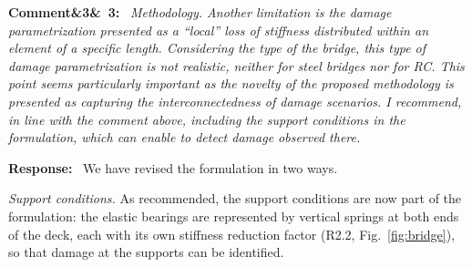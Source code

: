 \documentclass[11pt]{article}
\newenvironment{rcomment}[1]{\par\bigskip\noindent\textbf{Comment\ifx&#1&\else\ #1\fi:}\ \itshape}{\par}
\newenvironment{response}{\par\smallskip\noindent\color{resp}\textbf{Response:}\ }{\par}
\begin{document}
\begin{rcomment}{3}
Methodology. Another limitation is the damage parametrization presented as a ``local'' loss of stiffness distributed within an element of a specific length. Considering the type of the bridge, this type of damage parametrization is not realistic, neither for steel bridges nor for RC. This point seems particularly important as the novelty of the proposed
methodology is presented as capturing the interconnectedness of damage scenarios. I recommend, in line with the comment above, including the support conditions in the formulation, which can enable to detect damage observed there.
\end{rcomment}

\begin{response}
We have revised the formulation in two ways.

\textit{Support conditions.} As recommended, the support conditions are now part of the formulation: the elastic bearings
are represented by vertical springs at both ends of the deck, each with its own stiffness reduction factor (R2.2,
Fig.~\ref{fig:bridge}), so that damage at the supports can be identified.


\end{response}
\end{document}
